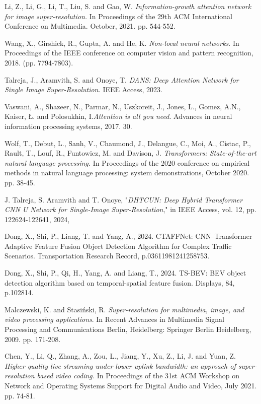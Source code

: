 \documentclass[twocolumn]{svjour3}          %
\begin{document}
\begin{thebibliography}{00}
 Li, Z., Li, G., Li, T., Liu, S. and Gao, W. \textit{Information-growth attention network for image super-resolution.} In Proceedings of the 29th ACM International Conference on Multimedia. October, 2021. pp. 544-552.

 Wang, X., Girshick, R., Gupta, A. and He, K. \textit{Non-local neural networks}. In Proceedings of the IEEE conference on computer vision and pattern recognition, 2018. (pp. 7794-7803).

 Talreja, J., Aramvith, S. and Onoye, T. \textit{DANS: Deep Attention Network for Single Image Super-Resolution.} IEEE Access, 2023.

 Vaswani, A., Shazeer, N., Parmar, N., Uszkoreit, J., Jones, L., Gomez, A.N., Kaiser, Ł. and Polosukhin, I.\textit{Attention is all you need}. Advances in neural information processing systems, 2017. 30.

 Wolf, T., Debut, L., Sanh, V., Chaumond, J., Delangue, C., Moi, A., Cistac, P., Rault, T., Louf, R., Funtowicz, M. and Davison, J. \textit{Transformers: State-of-the-art natural language processing.} In Proceedings of the 2020 conference on empirical methods in natural language processing: system demonstrations, October 2020. pp. 38-45.

 J. Talreja, S. Aramvith and T. Onoye, "\textit{DHTCUN: Deep Hybrid Transformer CNN U Network for Single-Image Super-Resolution}," in IEEE Access, vol. 12, pp. 122624-122641, 2024,

 Dong, X., Shi, P., Liang, T. and Yang, A., 2024. CTAFFNet: CNN–Transformer Adaptive Feature Fusion Object Detection Algorithm for Complex Traffic Scenarios. Transportation Research Record, p.03611981241258753.

 Dong, X., Shi, P., Qi, H., Yang, A. and Liang, T., 2024. TS-BEV: BEV object detection algorithm based on temporal-spatial feature fusion. Displays, 84, p.102814.

 Malczewski, K. and Stasiński, R. \textit{Super-resolution for multimedia, image, and video processing applications}. In Recent Advances in Multimedia Signal Processing and Communications Berlin, Heidelberg: Springer Berlin Heidelberg, 2009. pp. 171-208.

 Chen, Y., Li, Q., Zhang, A., Zou, L., Jiang, Y., Xu, Z., Li, J. and Yuan, Z. \textit{Higher quality live streaming under lower uplink bandwidth: an approach of super-resolution based video coding.} In Proceedings of the 31st ACM Workshop on Network and Operating Systems Support for Digital Audio and Video, July 2021. pp. 74-81.


\end{thebibliography}
\end{document}

